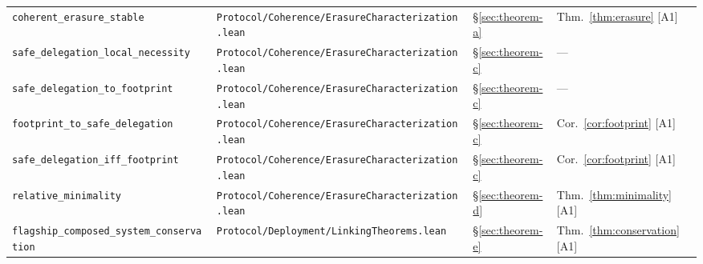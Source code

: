 \documentclass[a4paper,10pt,twocolumn,english]{article}
\numberwithin{equation}{section}
\theoremstyle{paperdef}
\theoremstyle{paperplain}
\theoremstyle{paperdef}
\theoremstyle{paperremark}
\theoremstyle{paperdef}
\begin{document}
\begin{table}[H]
\begin{tabularx}{\textwidth}{L{0.29\textwidth}L{0.37\textwidth}L{0.06\textwidth}>{\raggedright\arraybackslash}X}
		\texttt{coherent\_erasure\_\allowbreak stable}                                               & \texttt{Protocol/\allowbreak Coherence/\allowbreak}\mbox{\texttt{ErasureCharacterization.lean}}                                   & \S\ref{sec:theorem-a} & Thm.~\ref{thm:erasure} [A1]                                                                   \\
		\texttt{safe\_delegation\_\allowbreak local\_necessity}                                      & \texttt{Protocol/\allowbreak Coherence/\allowbreak}\mbox{\texttt{ErasureCharacterization.lean}}                                   & \S\ref{sec:theorem-c} & ---                                                                                           \\
		\texttt{safe\_delegation\_\allowbreak to\_footprint}                                         & \texttt{Protocol/\allowbreak Coherence/\allowbreak}\mbox{\texttt{ErasureCharacterization.lean}}                                   & \S\ref{sec:theorem-c} & ---                                                                                           \\
		\texttt{footprint\_to\_\allowbreak safe\_delegation}                                         & \texttt{Protocol/\allowbreak Coherence/\allowbreak}\mbox{\texttt{ErasureCharacterization.lean}}                                   & \S\ref{sec:theorem-c} & Cor.~\ref{cor:footprint} [A1]                                                                 \\
		\texttt{safe\_delegation\_\allowbreak iff\_footprint}                                        & \texttt{Protocol/\allowbreak Coherence/\allowbreak}\mbox{\texttt{ErasureCharacterization.lean}}                                   & \S\ref{sec:theorem-c} & Cor.~\ref{cor:footprint} [A1]                                                                 \\
		\texttt{relative\_minimality}                                                                & \texttt{Protocol/\allowbreak Coherence/\allowbreak}\mbox{\texttt{ErasureCharacterization.lean}}                                   & \S\ref{sec:theorem-d} & Thm.~\ref{thm:minimality} [A1]                                                                \\
		\texttt{flagship\_composed\_\allowbreak system\_conservation}                                & \texttt{Protocol/\allowbreak Deployment/\allowbreak}\mbox{\texttt{LinkingTheorems.lean}}                                          & \S\ref{sec:theorem-e} & Thm.~\ref{thm:conservation} [A1]                                                              \\

\end{tabularx}
\end{table}
\end{document}
